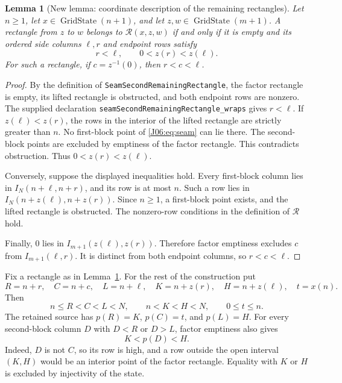 \documentclass[11pt,oneside]{report}
\newtheorem{lemma}[theorem]{Lemma}
\theoremstyle{definition}
\numberwithin{equation}{section}
\newcommand{\decl}[1]{\textnormal{\nolinkurl{#1}}}
\newcommand{\cR}{\mathcal R}
\begin{document}
\begin{lemma}[New lemma: coordinate description of the remaining rectangles]
\label{J06:lem:remaining}
Let $n\ge1$, let $x\in\operatorname{GridState}(n+1)$, and let
$z,w\in\operatorname{GridState}(m+1)$. A rectangle from $z$ to $w$
belongs to $\cR(x,z,w)$ if and only if it is empty and its ordered
side columns $\ell,r$ and endpoint rows satisfy
\[
 r<\ell,\qquad 0<z(r)<z(\ell).
\]
For such a rectangle, if $c=z^{-1}(0)$, then $r<c<\ell$.
\end{lemma}

\begin{proof}
By the definition of \decl{SeamSecondRemainingRectangle}, the factor
rectangle is empty, its lifted rectangle is obstructed, and both endpoint
rows are nonzero. The supplied declaration
\decl{seamSecondRemainingRectangle_wraps} gives $r<\ell$.
If $z(\ell)<z(r)$, the rows in the interior of the lifted rectangle are
strictly greater than $n$. No first-block point of \eqref{J06:eq:seam} can
lie there. The second-block points are excluded by emptiness of the
factor rectangle. This contradicts obstruction. Thus
$0<z(r)<z(\ell)$.

Conversely, suppose the displayed inequalities hold. Every first-block
column lies in $I_N(n+\ell,n+r)$, and its row is at most $n$. Such a
row lies in $I_N(n+z(\ell),n+z(r))$. Since $n\ge1$, a first-block
point exists, and the lifted rectangle is obstructed. The nonzero-row
conditions in the definition of $\cR$ hold.

Finally, $0$ lies in $I_{m+1}(z(\ell),z(r))$. Therefore factor emptiness
excludes $c$ from $I_{m+1}(\ell,r)$. It is distinct from both endpoint
columns, so $r<c<\ell$.
\end{proof}

Fix a rectangle as in Lemma~\ref{J06:lem:remaining}. For the rest of the
construction put
\begin{equation}\label{J06:eq:coordinates}
 R=n+r,\quad C=n+c,\quad L=n+\ell,\quad
 K=n+z(r),\quad H=n+z(\ell),\quad t=x(n).
\end{equation}
Then
\begin{equation}\label{J06:eq:orders}
 n\le R<C<L<N,\qquad n<K<H<N,\qquad 0\le t\le n.
\end{equation}
The retained source has $p(R)=K$, $p(C)=t$, and $p(L)=H$.
For every second-block column $D$ with $D<R$ or $D>L$, factor emptiness
also gives
\begin{equation}\label{J06:eq:outside}
 K<p(D)<H.
\end{equation}
Indeed, $D$ is not $C$, so its row is high, and a row outside the open
interval $(K,H)$ would be an interior point of the factor rectangle.
Equality with $K$ or $H$ is excluded by injectivity of the state.
\end{document}
